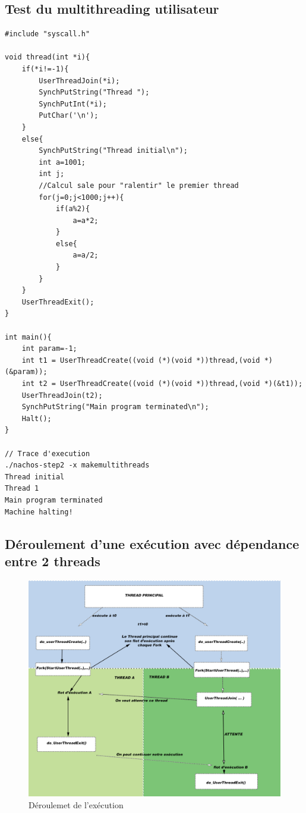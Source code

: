 \documentclass[a4paper,10pt]{article}
\begin{document}
\subsection{Test du multithreading utilisateur}

\begin{lstlisting}[frame=single]
 #include "syscall.h"

void thread(int *i){
	if(*i!=-1){
		UserThreadJoin(*i);
		SynchPutString("Thread ");
		SynchPutInt(*i);
		PutChar('\n');
	}
	else{
		SynchPutString("Thread initial\n");
		int a=1001;
		int j;	
		//Calcul sale pour "ralentir" le premier thread
		for(j=0;j<1000;j++){
			if(a%2){
				a=a*2;
			}
			else{
				a=a/2;
			}
		}
	}
	UserThreadExit();
}

int main(){
	int param=-1;
	int t1 = UserThreadCreate((void (*)(void *))thread,(void *)(&param));
	int t2 = UserThreadCreate((void (*)(void *))thread,(void *)(&t1));
	UserThreadJoin(t2);
	SynchPutString("Main program terminated\n");
	Halt();
}

// Trace d'execution
./nachos-step2 -x makemultithreads
Thread initial
Thread 1
Main program terminated
Machine halting!
\end{lstlisting}
\newpage
\subsection{Déroulement d'une exécution avec dépendance entre 2 threads}
\begin{figure}[h]
  \begin{center}
    \includegraphics[scale=0.39]{./nachos_join.png}
   \caption{\label{join} Déroulemet de l'exécution}
  \end{center}
\end{figure}
\end{document}

